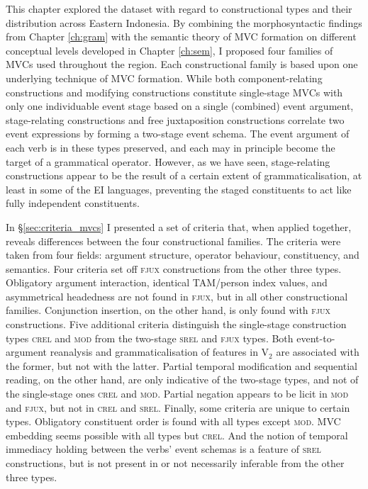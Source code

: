 This chapter explored the dataset with regard to constructional types and their distribution across Eastern Indonesia. By combining the morphosyntactic findings from Chapter \ref{ch:gram} with the semantic theory of MVC formation on different conceptual levels developed in Chapter \ref{ch:sem}, I proposed four families of MVCs used throughout the region. Each constructional family is based upon one underlying technique of MVC formation. While both component-relating constructions and modifying constructions constitute single-stage MVCs with only one individuable event stage based on a single (combined) event argument, stage-relating constructions and free juxtaposition constructions correlate two event expressions by forming a two-stage event schema. The event argument of each verb is in these types preserved, and each may in principle become the target of a grammatical operator. However, as we have seen, stage-relating constructions appear to be the result of a certain extent of grammaticalisation, at least in some of the EI languages, preventing the staged constituents to act like fully independent constituents. 

In §\ref{sec:criteria_mvcs} I presented a set of criteria that, when applied together, reveals differences between the four constructional families. The criteria were taken from four fields: argument structure, operator behaviour, constituency, and semantics. Four criteria set off \textsc{fjux} constructions from the other three types. Obligatory argument interaction, identical TAM/person index values, and asymmetrical headedness are not found in \textsc{fjux}, but in all other constructional families. Conjunction insertion, on the other hand, is only found with \textsc{fjux} constructions. Five additional criteria distinguish the single-stage construction types \textsc{crel} and \textsc{mod} from the two-stage \textsc{srel} and \textsc{fjux} types. Both event-to-argument reanalysis and grammaticalisation of features in V$_2$ are associated with the former, but not with the latter. Partial temporal modification and sequential reading, on the other hand, are only indicative of the two-stage types, and not of the single-stage ones \textsc{crel} and \textsc{mod}. Partial negation appears to be licit in \textsc{mod} and \textsc{fjux}, but not in \textsc{crel} and \textsc{srel}. Finally, some criteria are unique to certain types. Obligatory constituent order is found with all types except \textsc{mod}. MVC embedding seems possible with all types but \textsc{crel}. And the notion of temporal immediacy holding between the verbs' event schemas is a feature of \textsc{srel} constructions, but is not present in or not necessarily inferable from the other three types.

